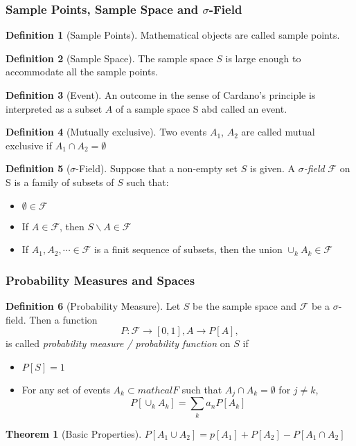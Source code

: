 \documentclass{article}
\theoremstyle{definition}
\newtheorem{definition}{Definition}[subsection]
\newtheorem{theorem}{Theorem}[subsection]
\begin{document}
\subsubsection{Sample Points, Sample Space and $\sigma$-Field }
\begin{definition}[Sample Points]
    Mathematical objects are called sample points.
\end{definition}
\begin{definition}[Sample Space]
    The sample space $S$ is large enough to accommodate all the sample points.
\end{definition}
\begin{definition}[Event]
    An outcome in the sense of Cardano's principle is interpreted as a subset $A$ of a sample space S abd called an event.
\end{definition}
\begin{definition}[Mutually exclusive]
    Two events $A_1$, $A_2$ are called mutual exclusive if $A_1\cap A_2=\emptyset$
\end{definition}
\begin{definition}[$\sigma$-Field]
    Suppose that a non-empty set $S$ is given. A \emph{$\sigma$-field} $\mathcal{F}$ on S is a family of subsets of $S$ such that:
   \begin{itemize}
       \item $\emptyset \in \mathcal{F}$
       \item If $A \in \mathcal{F}$, then $S\backslash A \in \mathcal{F}$
       \item If $A_1,A_2,\dotsm \in \mathcal{F}$ is a finit sequence of subsets, then the union $\cup_k A_k \in \mathcal{F}$
   \end{itemize}
\end{definition}
\subsubsection{Probability Measures and Spaces}
\begin{definition}[Probability Measure]
    Let $S$ be the sample space and $\mathcal{F}$ be a $\sigma$-field. Then a function
    \begin{equation}
        P:\mathcal{F} \rightarrow [0,1], A \rightarrow P[A],
    \end{equation}
    is called \emph{probability measure / probability function} on $S$ if
    \begin{itemize}
        \item $P[S]=1$
        \item For any set of events ${A_k}\subset mathcal{F}$ such that $A_j \cap A_k = \emptyset$ for $j \neq k$,
            \begin{equation}
                P[\cup_k A_k] = \sum_{k} a_n P[A_k]
            \end{equation}
    \end{itemize}
    \begin{theorem}[Basic Properties]
        $P[A_1\cup A_2] = p[A_1]+P[A_2]-P[A_1\cap A_2]$
    \end{theorem}
\end{definition}
\end{document}

